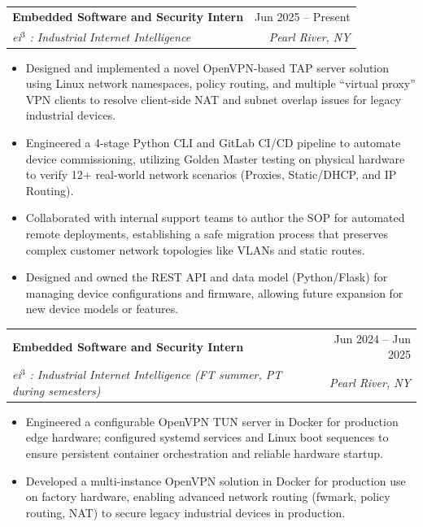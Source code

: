 \documentclass[letterpaper,11pt]{article}
\makeatletter
\newcommand{\resumeItem}[1]{
  \item\small{
    {#1 \vspace{-2pt}}
  }
}
\newcommand{\resumeSubheading}[4]{
  \vspace{-2pt}\item
    \begin{tabular*}{0.97\textwidth}[t]{l@{\extracolsep{\fill}}r}
      \textbf{#1} & #2 \\
      \textit{\small#3} & \textit{\small #4} \\
    \end{tabular*}\vspace{-7pt}
}
\newcommand{\resumeItemListStart}{\begin{itemize}}
\newcommand{\resumeItemListEnd}{\end{itemize}\vspace{-5pt}}
\makeatother
\begin{document}
    \resumeSubheading
      {Embedded Software and Security Intern}{Jun 2025 -- Present}
      {ei$^3$ : Industrial Internet Intelligence}{Pearl River, NY}
      \resumeItemListStart
        \resumeItem{Designed and implemented a novel OpenVPN-based TAP server solution using Linux network namespaces, policy routing, and multiple ``virtual proxy'' VPN clients to resolve client-side NAT and subnet overlap issues for legacy industrial devices.}
        \resumeItem{Engineered a 4-stage Python CLI and GitLab CI/CD pipeline to automate device commissioning, utilizing Golden Master testing on physical hardware to verify 12+ real-world network scenarios (Proxies, Static/DHCP, and IP Routing).}        
        \resumeItem{Collaborated with internal support teams to author the SOP for automated remote deployments, establishing a safe migration process that preserves complex customer network topologies like VLANs and static routes.}
        \resumeItem{Designed and owned the REST API and data model (Python/Flask) for managing device configurations and firmware, allowing future expansion for new device models or features.}
    \resumeItemListEnd
      
    \resumeSubheading
      {Embedded Software and Security Intern}{Jun 2024 -- Jun 2025}
      {ei$^3$ : Industrial Internet Intelligence \normalfont\small{\textit{(FT summer, PT during semesters)}}}{Pearl River, NY}
      \resumeItemListStart
        \resumeItem{Engineered a configurable OpenVPN TUN server in Docker for production edge hardware; configured systemd services and Linux boot sequences to ensure persistent container orchestration and reliable hardware startup.}
        \resumeItem{Developed a multi-instance OpenVPN solution in Docker for production use on factory hardware, enabling advanced network routing (fwmark, policy routing, NAT) to secure legacy industrial devices in production.}
      \resumeItemListEnd
      
\end{document}
